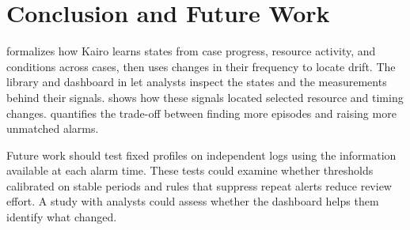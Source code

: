 \section{Conclusion and Future Work}
\label{sec:conclusion}

 formalizes how Kairo learns states from case progress, resource activity, and conditions across cases, then uses changes in their frequency to locate drift. The library and dashboard in  let analysts inspect the states and the measurements behind their signals.  shows how these signals located selected resource and timing changes.  quantifies the trade-off between finding more episodes and raising more unmatched alarms.

Future work should test fixed profiles on independent logs using the information available at each alarm time. These tests could examine whether thresholds calibrated on stable periods and rules that suppress repeat alerts reduce review effort. A study with analysts could assess whether the dashboard helps them identify what changed.
